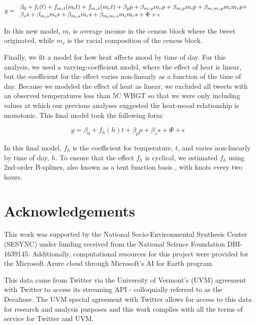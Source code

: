 \documentclass[fleqn,10pt]{wlscirep}
\begin{document}
\begin{equation}
 y = \begin{tabular}{l}
 $\beta_0 + f_t(t) + f_{m_{i}t}(m_{i} t) + f_{m_{r}t}(m_{r} t) + 
 \beta_p p + \beta_{m_{r} p} m_{r} p + 
 \beta_{m_{i} p} m_{i} p + \beta_{m_{i} m_{r} p} m_{i} m_{r} p + $
 \\
 $\beta_s s + \beta_{m_{i} s} m_{i} s + 
 \beta_{m_{r} s} m_{r} s + \beta_{m_{i} m_{r} s} m_{i} m_{r} s + 
 \Phi + \epsilon$
 \end{tabular}
 \label{mod:race-inc}
\end{equation}

In this new model, $m_{i}$ is average income in the census block where the tweet originated, while $m_{r}$ is the racial composition of the census block.

Finally, we fit a model for how heat affects mood by time of day. For this analysis, we used a varying-coefficient model, where the effect of heat is linear, but the coefficient for the effect varies non-linearly as a function of the time of day. Because we modeled the effect of heat as linear, we excluded all tweets with an observed temperatures less than 5\textdegree C WBGT so that we were only including values at which our previous analyses suggested the heat-mood relationship is monotonic. This final model took the following form:

\begin{equation}
 y = \beta_0 + f_h(h)t + \beta_p p + \beta_s s + \Phi + \epsilon
 \label{mod:tod}
\end{equation}

In this final model, $f_{h}$ is the coefficient for temperature, $t$, and varies non-linearly by time of day, $h$. To ensure that the effect $f_{h}$ is cyclical, we estimated $f_{h}$ using 2nd-order B-splines, also known as a tent function basis \cite[Chapter~4.2]{wood2017generalized}, with knots every two hours.

\section*{Acknowledgements}
This work was supported by the National Socio-Environmental Synthesis Center (SESYNC) under funding received from the National Science Foundation DBI-1639145. Additionally, computational resources for this project were provided for the Microsoft Azure cloud through Microsoft's AI for Earth program.

This data came from Twitter via the University of Vermont’s (UVM) agreement with Twitter to access its streaming API - colloquially referred to as the Decahose. The UVM special agreement with Twitter allows for access to this data for research and analysis purposes and this work complies with all the terms of service for Twitter and UVM. 
\end{document}
